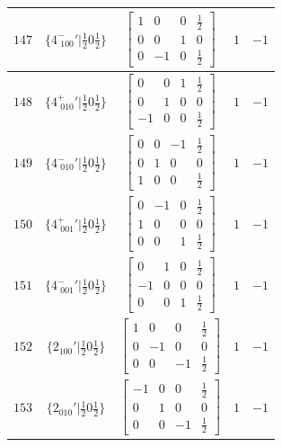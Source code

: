 \documentclass[fleqn,8pt]{jsarticle}
\begin{document}
\begin{longtable}{ccccc}
$ 147 $ & $ \{4^{-}_{\,\,100}{}'|\frac{1}{2} 0 \frac{1}{2}\} $ & $ \begin{bmatrix} 1 & 0 & 0 & \frac{1}{2} \\ 0 & 0 & 1 & 0 \\ 0 & -1 & 0 & \frac{1}{2} \end{bmatrix} $ & $ 1 $ & $ -1 $ \\ \hline
$ 148 $ & $ \{4^{+}_{\,\,010}{}'|\frac{1}{2} 0 \frac{1}{2}\} $ & $ \begin{bmatrix} 0 & 0 & 1 & \frac{1}{2} \\ 0 & 1 & 0 & 0 \\ -1 & 0 & 0 & \frac{1}{2} \end{bmatrix} $ & $ 1 $ & $ -1 $ \\ \hline
$ 149 $ & $ \{4^{-}_{\,\,010}{}'|\frac{1}{2} 0 \frac{1}{2}\} $ & $ \begin{bmatrix} 0 & 0 & -1 & \frac{1}{2} \\ 0 & 1 & 0 & 0 \\ 1 & 0 & 0 & \frac{1}{2} \end{bmatrix} $ & $ 1 $ & $ -1 $ \\ \hline
$ 150 $ & $ \{4^{+}_{\,\,001}{}'|\frac{1}{2} 0 \frac{1}{2}\} $ & $ \begin{bmatrix} 0 & -1 & 0 & \frac{1}{2} \\ 1 & 0 & 0 & 0 \\ 0 & 0 & 1 & \frac{1}{2} \end{bmatrix} $ & $ 1 $ & $ -1 $ \\ \hline
$ 151 $ & $ \{4^{-}_{\,\,001}{}'|\frac{1}{2} 0 \frac{1}{2}\} $ & $ \begin{bmatrix} 0 & 1 & 0 & \frac{1}{2} \\ -1 & 0 & 0 & 0 \\ 0 & 0 & 1 & \frac{1}{2} \end{bmatrix} $ & $ 1 $ & $ -1 $ \\ \hline
$ 152 $ & $ \{2{}_{100}{}'|\frac{1}{2} 0 \frac{1}{2}\} $ & $ \begin{bmatrix} 1 & 0 & 0 & \frac{1}{2} \\ 0 & -1 & 0 & 0 \\ 0 & 0 & -1 & \frac{1}{2} \end{bmatrix} $ & $ 1 $ & $ -1 $ \\ \hline
$ 153 $ & $ \{2{}_{010}{}'|\frac{1}{2} 0 \frac{1}{2}\} $ & $ \begin{bmatrix} -1 & 0 & 0 & \frac{1}{2} \\ 0 & 1 & 0 & 0 \\ 0 & 0 & -1 & \frac{1}{2} \end{bmatrix} $ & $ 1 $ & $ -1 $ \\ \hline

\end{longtable}
\end{document}
